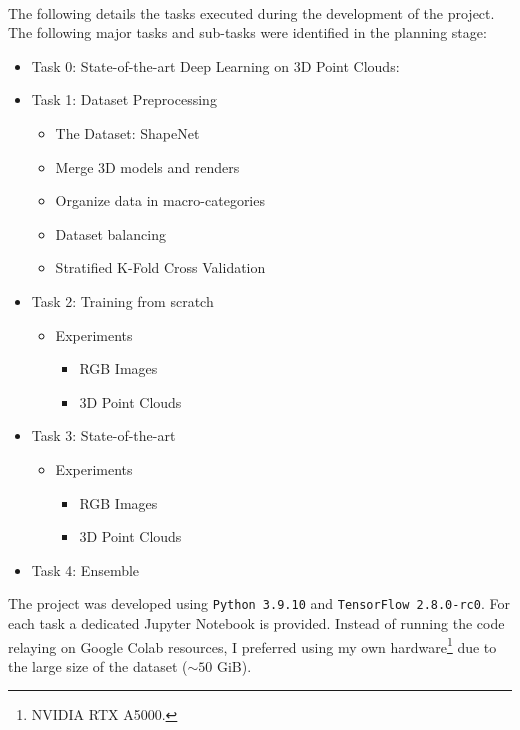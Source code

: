 \documentclass[11pt,a4paper]{article}
\begin{document}
\\
The following details the tasks executed during the development of the project. The following major tasks and sub-tasks were identified in the planning stage:
\begin{itemize}
    \item Task 0: State-of-the-art Deep Learning on 3D Point Clouds:
    \item Task 1: Dataset Preprocessing
        \begin{itemize}
            \item The Dataset: ShapeNet
            \item Merge 3D models and renders
            \item Organize data in macro-categories
            \item Dataset balancing
            \item Stratified K-Fold Cross Validation
        \end{itemize}
    \item Task 2: Training from scratch
        \begin{itemize}
            \item Experiments
            \begin{itemize}
                \item RGB Images
                \item 3D Point Clouds
            \end{itemize}
        \end{itemize}
    \item Task 3: State-of-the-art
        \begin{itemize}
            \item Experiments
            \begin{itemize}
                \item RGB Images
                \item 3D Point Clouds
            \end{itemize}
        \end{itemize}
    \item Task 4: Ensemble
\end{itemize}
The project was developed using \texttt{Python 3.9.10} and \texttt{TensorFlow 2.8.0-rc0}. For each task a dedicated Jupyter Notebook is provided. Instead of running the code relaying on Google Colab resources, I preferred using my own hardware\footnote{NVIDIA RTX A5000.} due to the large size of the dataset ($\sim 50$ GiB).\\
\end{document}
